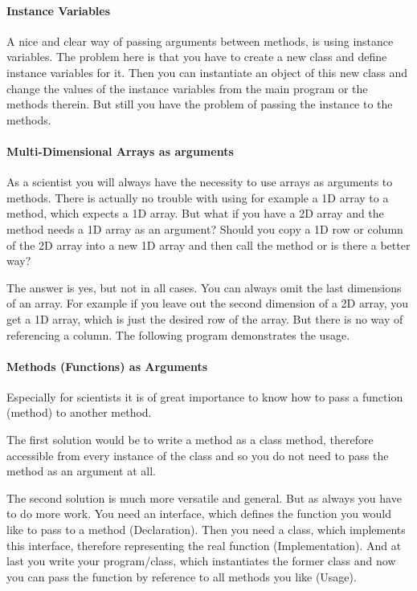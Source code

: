 \paragraph{Instance Variables}
A nice and clear way of passing arguments between methods, is
using instance variables. The problem here is that you have
to create a new class and define instance variables for it.
Then you can instantiate an object of this new class and
change the values of the instance variables from the main
program or the methods therein. But still you have the problem
of passing the instance to the methods.

\paragraph{Multi-Dimensional Arrays as arguments}
As a scientist you will always have the necessity to use arrays
as arguments to methods. There is actually no trouble with using
for example a 1D array to a method, which expects a 1D array. But 
what if you have a 2D array and the method needs a 1D array as
an argument? Should you copy a 1D row or column of the 2D array
into a new 1D array and then call the method or is there a better
way? 

The answer is yes, but not in all cases. You can always omit 
the last dimensions of an array. For example if you leave out
the second dimension of a 2D array, you get a 1D array, which is 
just the desired row of the array. But there is no way of referencing a
column. The following program demonstrates the usage.

\paragraph{Methods (Functions) as Arguments} 
Especially for scientists it is of great importance to know how
to pass a function (method) to another method.

The first solution would be to write a method as a class method,
therefore accessible from every instance of the class and
so you do not need to pass the method as an argument at all.

The second solution is much more versatile and general.
But as always you have to do more work. You need an interface,
which defines the function you would like to pass to a method
(Declaration). Then you need a class, which implements this
interface, therefore representing the real function (Implementation).
And at last you write your program/class, which instantiates
the former class and now you can pass the function by reference
to all methods you like (Usage).  

